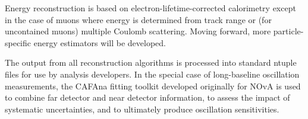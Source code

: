 Energy reconstruction is based on electron-lifetime-corrected calorimetry except in the case of muons where energy is determined from track range or (for uncontained muons) multiple Coulomb scattering.  Moving forward, more particle-specific energy estimators will be developed.

The output from all reconstruction algorithms is processed into standard ntuple files for use by analysis developers.  In the special case of long-baseline oscillation measurements, the CAFAna fitting toolkit developed originally for NOvA is used to combine far detector and near detector information, to assess the impact of systematic uncertainties, and to ultimately produce oscillation sensitivities.
